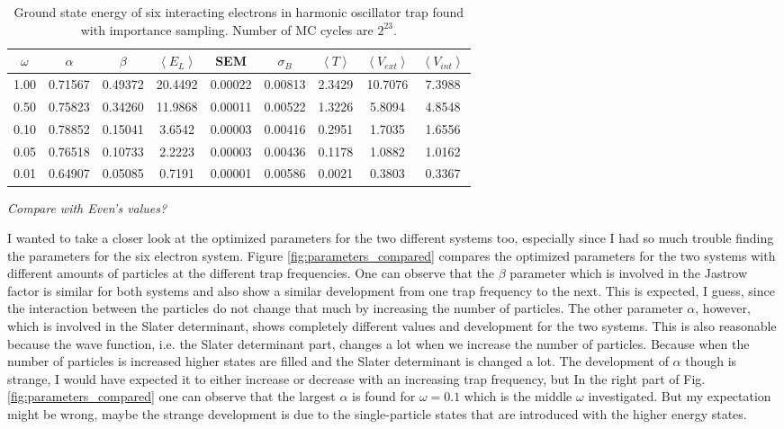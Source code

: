 \begin{table}[H]\caption{Ground state energy of six interacting electrons in harmonic oscillator trap found with importance sampling. Number of MC cycles are $2^{23}$.}\label{tab:ground_state_energy_importance_interaction_6p}
\center
\begin{tabular}{c|cccccccc}
$\omega$ & $\alpha$ & $\beta$ & $\left< E_L \right>$ & SEM & $\sigma_B$ &  $\left< T \right>$  & $\left< V_{ext}\right>$ & $\left<V_{int} \right>$  \\ \hline
1.00 & 0.71567 & 0.49372 & 20.4492 & 0.00022 & 0.00813 & 2.3429 & 10.7076 & 7.3988\\
0.50 & 0.75823 & 0.34260 & 11.9868 & 0.00011 & 0.00522 & 1.3226 & 5.8094 & 4.8548\\
0.10 & 0.78852 & 0.15041 & 3.6542 & 0.00003 & 0.00416 & 0.2951 & 1.7035 & 1.6556\\
0.05 & 0.76518 & 0.10733 & 2.2223 & 0.00003 & 0.00436 &  0.1178 & 1.0882 & 1.0162\\
0.01 & 0.64907 & 0.05085 & 0.7191 & 0.00001 & 0.00586 & 0.0021 & 0.3803 & 0.3367\\
\end{tabular}
\end{table}

\textit{Compare with Even's values?}

I wanted to take a closer look at the optimized parameters for the two different systems too, especially since I had so much trouble finding the parameters for the six electron system. Figure \ref{fig:parameters_compared} compares the optimized parameters for the two systems with different amounts of particles at the different trap frequencies. One can observe that the $\beta$ parameter which is involved in the Jastrow factor is similar for both systems and also show a similar development from one trap frequency to the next. This is expected, I guess, since the interaction between the particles do not change that much by increasing the number of particles. The other parameter $\alpha$, however, which is involved in the Slater determinant, shows completely different values and development for the two systems. This is also reasonable because the wave function, i.e. the Slater determinant part, changes a lot when we increase the number of particles. Because when the number of particles is increased higher states are filled and the Slater determinant is changed a lot. The development of $\alpha$ though is strange, I would have expected it to either increase or decrease with an increasing trap frequency, but In the right part of Fig. \ref{fig:parameters_compared} one can observe that the largest $\alpha$ is found for $\omega = 0.1$ which is the middle $\omega$ investigated. But my expectation might be wrong, maybe the strange development is due to the single-particle states that are introduced with the higher energy states. 

